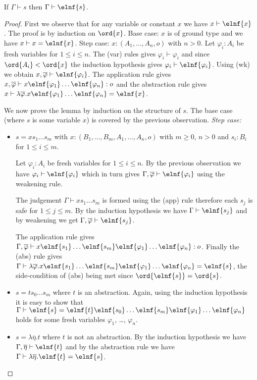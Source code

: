 \begin{lem}
If $\Gamma \vdash s$ then $\Gamma \vdash \elnf{s}$.
\end{lem}
\begin{proof}

First we observe that for any variable or constant $x$ we have $x \vdash \elnf{x}$. The proof is by induction on $\ord{x}$. Base case: $x$ is of ground type and we have $x \vdash x = \elnf{x}$. Step case:
$x:(A_1, \ldots, A_n,o)$ with $n>0$. Let $\varphi_i:A_i$ be fresh variables for $1\leq i\leq n$. The (var) rules gives $\varphi_i  \vdash \varphi_i$ and since $\ord{A_i} < \ord{x}$ the induction hypothesis gives $\varphi_i \vdash \elnf{\varphi_i}$. Using (wk) we obtain $x, \overline{\varphi} \vdash \elnf{\varphi_i}$.
The application rule gives $x, \overline{\varphi} \vdash x \elnf{\varphi_1} \ldots \elnf{\varphi_n} : o$ and the abstraction rule gives $ x \vdash \lambda \overline{\varphi} . x \elnf{\varphi_1} \ldots \elnf{\varphi_n} = \elnf{x}$.


We now prove the lemma by induction on the structure of $s$.
The base case (where $s$ is some variable $x$) is covered by the previous observation.
\emph{Step case:}
\begin{itemize}
\item $s = x s_1 \ldots s_m$ with $x: (B_1, \ldots, B_m, A_1, \ldots, A_n, o)$ with $m\geq 0$, $n>0$ and $s_i : B_i$ for $1 \leq i \leq m$.

Let $\varphi_i: A_i$ be fresh variables for $1\leq i \leq n$. By the previous observation we have $\varphi_i \vdash \elnf{\varphi_i}$ which in turn gives $\Gamma , \overline{\varphi} \vdash \elnf{\varphi_i}$ using the weakening rule.

The judgement $\Gamma \vdash x s_1 \ldots s_m$ is formed using the (app) rule therefore each $s_j$ is safe for $1\leq j \leq m$. By the induction hypothesis we have $\Gamma \vdash \elnf{s_j}$ and by weakening we get $\Gamma, \overline{\varphi} \vdash \elnf{s_j}$.

The application rule gives $\Gamma, \overline{\varphi} \vdash
x \elnf{s_1} \ldots \elnf{s_m} \elnf{\varphi_1} \ldots \elnf{\varphi_n} : o$. Finally the (abs) rule gives $\Gamma \vdash \lambda \overline{\varphi} . x \elnf{s_1} \ldots \elnf{s_m}  \elnf{\varphi_1} \ldots \elnf{\varphi_n} = \elnf{s}$, the side-condition of (abs) being met since $\ord{\elnf{s}} = \ord{s}$.


\item $s = t s_0 \ldots s_m$ where $t$ is an abstraction. Again, using the induction hypothesis it is easy to show that $\Gamma \vdash \elnf{s} = \elnf{t} \elnf{s_0} \ldots \elnf{s_m} \elnf{\varphi_1} \ldots \elnf{\varphi_n}$ holds for some fresh variables $\varphi_1$, \ldots, $\varphi_n$.

\item $s = \lambda \overline{\eta} . t$ where $t$ is not an abstraction. By the induction hypothesis we have $\Gamma, \overline{\eta} \vdash \elnf{t}$ and by the abstraction rule we have $\Gamma \vdash \lambda \overline{\eta} . \elnf{t} = \elnf{s}$.
\end{itemize}
\end{proof}

